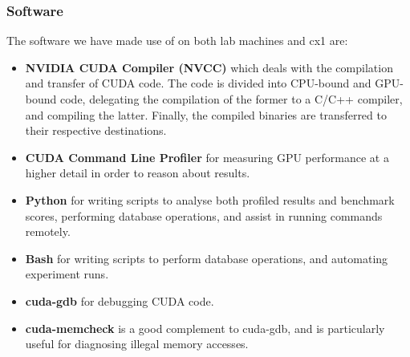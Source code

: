 \subsubsection{Software}
The software we have made use of on both lab machines and cx1 are:
\begin{itemize}
  \item \textbf{NVIDIA CUDA Compiler (NVCC)} which deals with the compilation and transfer of CUDA code. The code is divided into CPU-bound and GPU-bound code, delegating the compilation of the former to a C/C++ compiler, and compiling the latter. Finally, the compiled binaries are transferred to their respective destinations.
  \item \textbf{CUDA Command Line Profiler} for measuring GPU performance at a higher detail in order to reason about results.
  \item \textbf{Python} for writing scripts to analyse both profiled results and benchmark scores, performing database operations, and assist in running commands remotely.
  \item \textbf{Bash} for writing scripts to perform database operations, and automating experiment runs.
  \item \textbf{cuda-gdb} for debugging CUDA code.
  \item \textbf{cuda-memcheck} is a good complement to cuda-gdb, and is particularly useful for diagnosing illegal memory accesses.
\end{itemize}